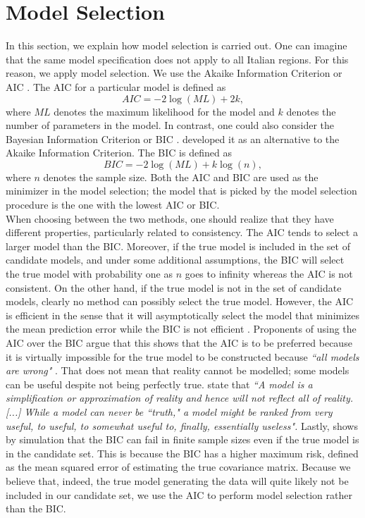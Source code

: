 \documentclass[12pt]{article}
\begin{document}
	\section{Model Selection} \label{sec:model_selection}
	In this section, we explain how model selection is carried out. One can imagine that the same model specification does not apply to all Italian regions. For this reason, we apply model selection. We use the Akaike Information Criterion or AIC \parencite{akaike1974new}. The AIC for a particular model is defined as
	\begin{equation} \label{eq:AIC}
    	AIC = -2\log(ML) + 2k,    
	\end{equation}
	where $ML$ denotes the maximum likelihood for the model and $k$ denotes the number of parameters in the model. In contrast, one could also consider the Bayesian Information Criterion or BIC \parencite{schwarz1978estimating}. \textcite{schwarz1978estimating} developed it as an alternative to the Akaike Information Criterion. The BIC is defined as
	\begin{equation} \label{eq:BIC}
    	BIC = -2\log(ML) + k\log(n),
	\end{equation}
	where $n$ denotes the sample size. Both the AIC and BIC are used as the minimizer in the model selection; the model that is picked by the model selection procedure is the one with the lowest AIC or BIC. \\
	
	When choosing between the two methods, one should realize that they have different properties, particularly related to consistency. The AIC tends to select a larger model than the BIC. Moreover, if the true model is included in the set of candidate models, and under some additional assumptions, the BIC will select the true model with probability one as $n$ goes to infinity whereas the AIC is not consistent. On the other hand, if the true model is not in the set of candidate models, clearly no method can possibly select the true model. However, the AIC is efficient in the sense that it will asymptotically select the model that minimizes the mean prediction error while the BIC is not efficient \parencite{vrieze2012model}. Proponents of using the AIC over the BIC argue that this shows that the AIC is to be preferred because it is virtually impossible for the true model to be constructed because \textit{``all models are wrong"} \parencite{box1976science}. That does not mean that reality cannot be modelled; some models can be useful despite not being perfectly true. \textcite{burnham2002practical} state that \textit{``A model is a simplification or approximation of reality and hence will not reflect all of reality. [...] While a model can never be ``truth," a model might be ranked from very useful, to useful, to somewhat useful to, finally, essentially useless".} Lastly, \textcite{vrieze2012model} shows by simulation that the BIC can fail in finite sample sizes even if the true model is in the candidate set. This is because the BIC has a higher maximum risk, defined as the mean squared error of estimating the true covariance matrix. Because we believe that, indeed, the true model generating the data will quite likely not be included in our candidate set, we use the AIC to perform model selection rather than the BIC.
	
\end{document}
